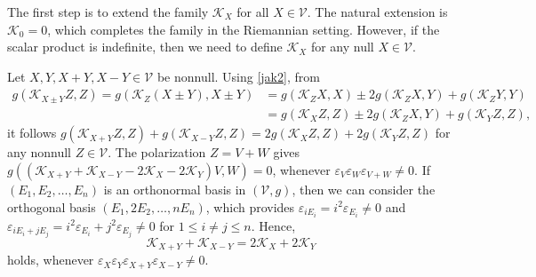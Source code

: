 \documentclass[preprint]{elsarticle}
\newcommand\mc{\mathcal}
\newcommand\ve{\varepsilon}%
\begin{document}
The first step is to extend the family $\mc{K}_X$ for all $X\in\mc{V}$.
The natural extension is $\mc{K}_0=0$, which completes the family in the Riemannian setting.
However, if the scalar product is indefinite, then we need to define $\mc{K}_X$ for any null $X\in\mc{V}$.

Let $X,Y,X+Y,X-Y\in\mc{V}$ be nonnull. Using \eqref{jak2}, from 
\begin{equation*}
\begin{aligned}
g(\mc{K}_{X\pm Y}Z,Z)=g(\mc{K}_Z(X\pm Y),X\pm Y)
&=g(\mc{K}_Z X,X) \pm 2g(\mc{K}_Z X, Y) +g(\mc{K}_Z Y,Y)\\
&=g(\mc{K}_X Z,Z) \pm 2g(\mc{K}_Z X, Y) +g(\mc{K}_Y Z,Z),
\end{aligned}
\end{equation*}
it follows $g(\mc{K}_{X+Y}Z,Z)+g(\mc{K}_{X-Y}Z,Z)=2g(\mc{K}_X Z,Z)+2g(\mc{K}_Y Z,Z)$ for any nonnull $Z\in\mc{V}$.
The polarization $Z=V+W$ gives $g((\mc{K}_{X+Y}+\mc{K}_{X-Y}-2\mc{K}_X-2\mc{K}_Y)V,W)=0$, whenever $\ve_V\ve_W\ve_{V+W}\neq 0$. 
If $(E_1,E_2,\dots,E_n)$ is an orthonormal basis in $(\mc{V},g)$, then we can consider the orthogonal basis $(E_1,2E_2,\dots,nE_n)$,
which provides $\ve_{iE_i}=i^2\ve_{E_i}\neq 0$ and $\ve_{iE_i+jE_j}=i^2\ve_{E_i}+j^2\ve_{E_j}\neq 0$ for $1\leq i\neq j\leq n$.
Hence,
\begin{equation}\label{existnull}
\mc{K}_{X+Y}+\mc{K}_{X-Y}=2\mc{K}_X+2\mc{K}_Y
\end{equation}
holds, whenever $\ve_X\ve_Y\ve_{X+Y}\ve_{X-Y}\neq 0$.
\end{document}

